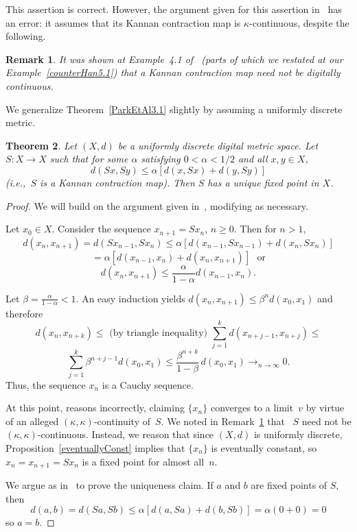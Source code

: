 \documentclass{article}
\newtheorem{thm}{Theorem}
\newtheorem{remarks}[thm]{Remark}
\numberwithin{thm}{section}
\begin{document}
This assertion is correct. However,
the argument given for this assertion in~\cite{ParkEtAl}
has an error: it assumes that
its Kannan contraction map is
$\kappa$-continuous, despite the following.

\begin{remarks}
\label{KannanRemark}
    It was shown at Example~4.1
of~\cite{BxSt19} (parts of which we 
restated at our Example~\ref{counterHan5.1})
that a Kannan contraction map
need not be digitally
continuous.
\end{remarks}

We generalize Theorem~\ref{ParkEtAl3.1}
slightly by assuming a uniformly
discrete metric.

\begin{thm}
    \label{ParkEtAl3.1Corrected}
     Let $(X,d)$ be a uniformly discrete digital 
     metric space. Let $S: X \to X$ such that for some
     $\alpha$ satisfying $0 < \alpha < 1/2$ and all $x,y \in X$,
    \[ d(Sx, Sy) \le \alpha [d(x,Sx) + d(y,Sy)]
    \]
   (i.e.,~$S$ is a Kannan
   contraction map).
   Then $S$ has a unique fixed point in $X$.
\end{thm}

\begin{proof}
    We will build on the argument given in~\cite{ParkEtAl}, modifying
    as necessary.

    Let $x_0 \in X$. Consider the sequence $x_{n+1} = Sx_n$, $n \ge 0$.
    Then for $n>1$,
    \[ d(x_n,x_{n+1}) = d(Sx_{n-1},Sx_n) \le 
       \alpha [d(x_{n-1},Sx_{n-1}) + d(x_n,Sx_n)] 
       \]
    \[ = \alpha[d(x_{n-1}, x_n) +  d(x_n, x_{n+1})]~~~\mbox{or}
    \]
    \[ d(x_n,x_{n+1}) \le \frac{\alpha}{1 - \alpha} d(x_{n-1}, x_n).
    \]

    Let $\beta = \frac{\alpha}{1 - \alpha} < 1$. An easy
    induction yields $d(x_n,x_{n+1}) \le \beta^n d(x_0,x_1)$ and
    therefore
    \[ d(x_n,x_{n+k}) \le \mbox{ (by triangle inequality) }
       \sum_{j=1}^k d(x_{n+j-1},x_{n+j}) \le 
       \]
       \[
        \sum_{j=1}^k \beta^{n+j-1} d(x_0,x_1) \le
        \frac{\beta^{n+k}}{1 - \beta} \, d(x_0,x_1) \to_{n \to \infty} 0.
    \]
    Thus, the sequence $x_n$ is a Cauchy sequence.
    
    At this point, \cite{ParkEtAl} reasons 
    incorrectly, claiming 
    $\{x_n\}$ converges to a
    limit~$v$ by virtue of an alleged $(\kappa,\kappa)$-continuity of~$S$.
    We noted in Remark~\ref{KannanRemark} that
    ~$S$ need not be $(\kappa,\kappa)$-continuous. Instead, we reason that
    since $(X,d)$ is uniformly discrete, 
    Proposition~\ref{eventuallyConst} implies that
    $\{x_n\}$ is eventually constant, so 
    $x_n = x_{n+1} = Sx_n$ is a fixed point for almost
    all~$n$.

We argue as in~\cite{ParkEtAl} 
to prove the uniqueness
claim. If $a$ and $b$ are fixed points of $S$, then
\[ d(a,b) = d(Sa,Sb) \le \alpha [d(a,Sa) + d(b,Sb)] = \alpha (0+0) = 0
\]
so $a=b$.
\end{proof}
\end{document}
